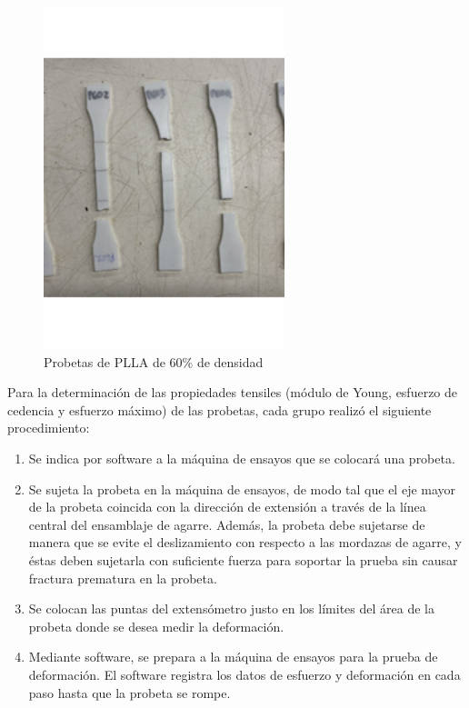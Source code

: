 \documentclass[journal,transmag]{IEEEtran}
\begin{document}
\begin{figure}[!h]
		\center
		\includegraphics[width=7cm]{imagenes/muestras.png}
		\caption{Probetas de PLLA de 60\% de densidad   }
		\label{30}
	\end{figure}


Para la determinación de las propiedades tensiles (módulo de Young, esfuerzo de cedencia y esfuerzo máximo) de las probetas, cada grupo realizó el siguiente procedimiento: 

	\begin{enumerate}
	
    \item Se indica por software a la máquina de ensayos que se colocará una probeta. 
     \item     Se sujeta la probeta en la máquina de ensayos, de modo tal que el eje mayor de la probeta coincida con la dirección de extensión a través de la línea central del ensamblaje de agarre. Además, la probeta debe sujetarse de manera que se evite el deslizamiento con respecto a las mordazas de agarre, y éstas deben sujetarla con suficiente fuerza para soportar la prueba sin causar fractura prematura en la probeta. 
      \item     Se colocan las puntas del extensómetro justo en los límites del área de la probeta donde se desea medir la deformación. 
       \item     Mediante software, se prepara a la máquina de ensayos para la prueba de deformación. El software registra los datos de esfuerzo y deformación en cada paso hasta que la probeta se rompe. 
    
    	\end{enumerate}
    	
\end{document}

